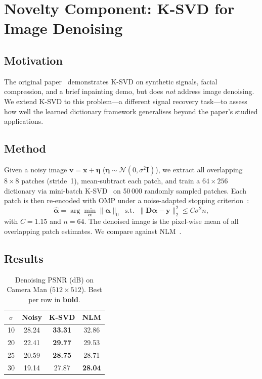 \documentclass[conference]{IEEEtran}
\begin{document}
\section{Novelty Component: K-SVD for Image Denoising}

\subsection{Motivation}

The original paper~\cite{aharon2006ksvd} demonstrates K-SVD on
synthetic signals, facial compression, and a brief inpainting
demo, but does \emph{not} address image denoising.
We extend K-SVD to this problem---a different signal recovery
task---to assess how well the learned dictionary framework
generalises beyond the paper's studied applications.

\subsection{Method}

Given a noisy image $\mathbf{v}=\mathbf{x}+\boldsymbol\eta$
($\boldsymbol\eta\sim\mathcal{N}(0,\sigma^2\mathbf{I})$), we
extract all overlapping $8\times8$ patches (stride~1), mean-subtract
each patch, and train a $64\times256$ dictionary via mini-batch
K-SVD~\cite{scikit-learn} on 50\,000 randomly sampled patches.
Each patch is then re-encoded with OMP under a noise-adapted
stopping criterion~\cite{elad2006denoising}:
\begin{equation}
    \hat{\boldsymbol\alpha} = \arg\min_{\boldsymbol\alpha}
    \|\boldsymbol\alpha\|_0\;\;\text{s.t.}\;\;
    \|\mathbf{D}\boldsymbol\alpha-\mathbf{y}\|_2^2
    \leq C\sigma^2 n,
    \label{eq:omp_tol}
\end{equation}
with $C=1.15$ and $n=64$.
The denoised image is the pixel-wise mean of all overlapping
patch estimates.
We compare against NLM~\cite{buades2005nlm}.

\subsection{Results}

\begin{table}[h]
\centering
\caption{Denoising PSNR (dB) on Camera Man ($512\times512$).
         Best per row in \textbf{bold}.}
\label{tab:denoising}
\begin{tabular}{@{}cccc@{}}
\toprule
$\sigma$ & Noisy & K-SVD & NLM \\
\midrule
10 & 28.24 & \textbf{33.31} & 32.86 \\
20 & 22.41 & \textbf{29.77} & 29.53 \\
25 & 20.59 & \textbf{28.75} & 28.71 \\
30 & 19.14 & 27.87          & \textbf{28.04} \\
\bottomrule
\end{tabular}
\end{table}
\end{document}
